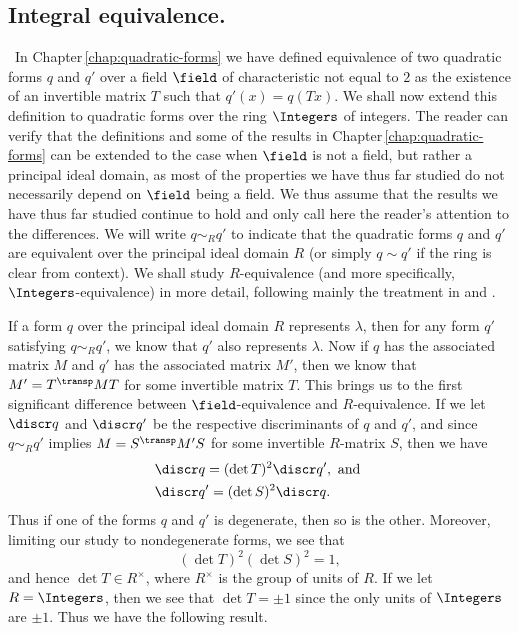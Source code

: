 \subsection{Integral equivalence.}~In Chapter\,\ref{chap:quadratic-forms} we have defined equivalence of two quadratic forms \(q\) and \(q'\) over a field \(\field\) of characteristic not equal to \(2\) as the existence of an invertible matrix \(T\) such that \(q'(x) = q(Tx)\). We shall now extend this definition to quadratic forms over the ring \(\Integers\) of integers. The reader can verify that the definitions and some of the results in Chapter\,\ref{chap:quadratic-forms}  can be extended to the case when \(\field\) is not a field, but rather a principal ideal domain, as most of the properties we have thus far studied do not necessarily depend on \(\field\) being a field. We thus assume that the results we have thus far studied continue to hold and only call here the reader's attention to the differences. We will write \(q \sim_{R} q'\) to indicate that the quadratic forms \(q\) and \(q'\) are equivalent over the principal ideal domain \(R\) (or simply \(q \sim q'\) if the ring is clear from context). We shall study \(R\)-equivalence (and more specifically, \(\Integers\)-equivalence) in more detail, following mainly the treatment in \cite{cassels2008rational} and \cite{jones1950arithmetic}.

If a form \(q\) over the principal ideal domain \(R\) represents \(\lambda\), then for any form \(q'\) satisfying \(q \sim_{R} q'\), we know that \(q'\) also represents \(\lambda\). Now if \(q\) has the associated matrix \(M\) and \(q'\) has the associated matrix \(M'\), then we know that \(M' = T^{\transp} M T\) for some invertible matrix \(T\). This brings us to the first significant difference between \(\field\)-equivalence and \(R\)-equivalence. If we let \(\discr q\) and \(\discr q'\) be the respective discriminants of \(q\) and \(q'\), and since \(q \sim_{R} q'\) implies \(M = S^{\transp} M' S\) for some invertible \(R\)-matrix \(S\), then we have
\begin{align*}
    &\discr q = (\det T)^2 \discr q',\text{ and }\\
    &\discr q' = (\det S)^2 \discr q.
\end{align*}
Thus if one of the forms \(q\) and \(q'\) is degenerate, then so is the other. Moreover, limiting our study to nondegenerate forms, we see that
\[
  (\det T)^2 (\det S)^2 = 1,
\]
and hence \(\det T \in R^{\times}\), where \(R^{\times}\) is the group of units of \(R\). If we let \(R = \Integers\), then we see that \(\det T = \pm 1\) since the only units of \(\Integers\) are \(\pm 1\). Thus we have the following result.

